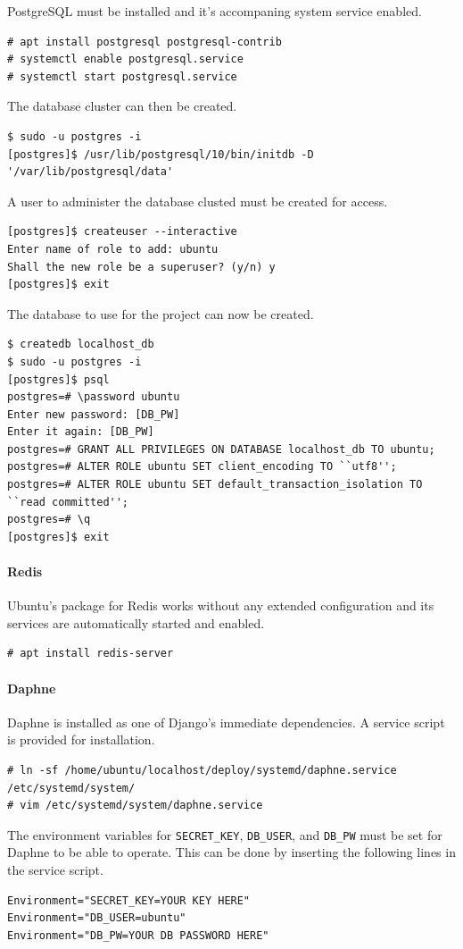 PostgreSQL must be installed and it's accompaning system service enabled.
\begin{lstlisting}
# apt install postgresql postgresql-contrib
# systemctl enable postgresql.service
# systemctl start postgresql.service
\end{lstlisting}
The database cluster can then be created.
\begin{lstlisting}
$ sudo -u postgres -i
[postgres]$ /usr/lib/postgresql/10/bin/initdb -D '/var/lib/postgresql/data'
\end{lstlisting}
A user to administer the database clusted must be created for access.
\begin{lstlisting}
[postgres]$ createuser --interactive
Enter name of role to add: ubuntu
Shall the new role be a superuser? (y/n) y
[postgres]$ exit
\end{lstlisting}
The database to use for the project can now be created.
\begin{lstlisting}
$ createdb localhost_db
$ sudo -u postgres -i
[postgres]$ psql
postgres=# \password ubuntu
Enter new password: [DB_PW]
Enter it again: [DB_PW]
postgres=# GRANT ALL PRIVILEGES ON DATABASE localhost_db TO ubuntu;
postgres=# ALTER ROLE ubuntu SET client_encoding TO ``utf8'';
postgres=# ALTER ROLE ubuntu SET default_transaction_isolation TO ``read committed'';
postgres=# \q
[postgres]$ exit
\end{lstlisting}

\paragraph{Redis}

Ubuntu's package for Redis works without any extended configuration and its
services are automatically started and enabled.
\begin{lstlisting}
# apt install redis-server
\end{lstlisting}

\paragraph{Daphne}

Daphne is installed as one of Django's immediate dependencies.
A service script is provided for installation.
\begin{lstlisting}
# ln -sf /home/ubuntu/localhost/deploy/systemd/daphne.service /etc/systemd/system/
# vim /etc/systemd/system/daphne.service
\end{lstlisting}
The environment variables for \lstinline{SECRET_KEY}, \lstinline{DB_USER}, and
\lstinline{DB_PW} must be set for Daphne to be able to operate. This
can be done by inserting the following lines in the service script.
\begin{lstlisting}
Environment="SECRET_KEY=YOUR KEY HERE"
Environment="DB_USER=ubuntu"
Environment="DB_PW=YOUR DB PASSWORD HERE"
\end{lstlisting}

